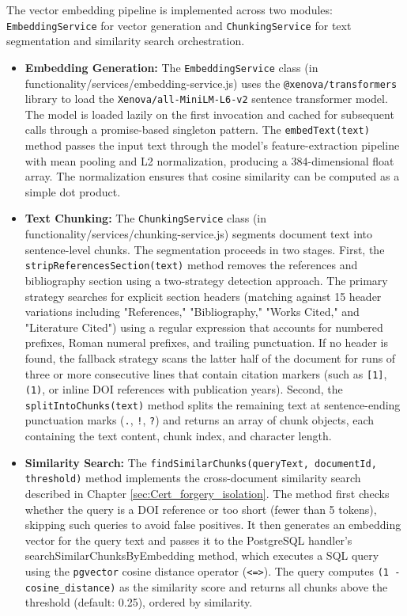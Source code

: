 The vector embedding pipeline is implemented across two modules: \texttt{EmbeddingService} for vector generation and \texttt{ChunkingService} for text segmentation and similarity search orchestration.
\begin{itemize}
    
\item \textbf{Embedding Generation:} The \texttt{EmbeddingService} class (in {functionality/services/embedding-service.js}) uses the \texttt{@xenova/transformers} library to load the \texttt{Xenova/all-MiniLM-L6-v2} sentence transformer model. The model is loaded lazily on the first invocation and cached for subsequent calls through a promise-based singleton pattern. The \texttt{embedText(text)} method passes the input text through the model's feature-extraction pipeline with mean pooling and L2 normalization, producing a 384-dimensional float array. The normalization ensures that cosine similarity can be computed as a simple dot product.

\item \textbf{Text Chunking:} The \texttt{ChunkingService} class (in {functionality/services/chunking-service.js}) segments document text into sentence-level chunks. The segmentation proceeds in two stages. First, the \texttt{stripReferencesSection(text)} method removes the references and bibliography section using a two-strategy detection approach. The primary strategy searches for explicit section headers (matching against 15 header variations including "References," "Bibliography," "Works Cited," and "Literature Cited") using a regular expression that accounts for numbered prefixes, Roman numeral prefixes, and trailing punctuation. If no header is found, the fallback strategy scans the latter half of the document for runs of three or more consecutive lines that contain citation markers (such as \texttt{[1]}, \texttt{(1)}, or inline DOI references with publication years). Second, the \texttt{splitIntoChunks(text)} method splits the remaining text at sentence-ending punctuation marks (\texttt{.}, \texttt{!}, \texttt{?}) and returns an array of chunk objects, each containing the text content, chunk index, and character length.

\item \textbf{Similarity Search:} The \texttt{findSimilarChunks(queryText, documentId, threshold)} method implements the cross-document similarity search described in Chapter \ref{sec:Cert_forgery_isolation}. The method first checks whether the query is a DOI reference or too short (fewer than 5 tokens), skipping such queries to avoid false positives. It then generates an embedding vector for the query text and passes it to the PostgreSQL handler's {searchSimilarChunksByEmbedding} method, which executes a SQL query using the \texttt{pgvector} cosine distance operator (\texttt{<=>}). The query computes \texttt{(1 - cosine\_distance)} as the similarity score and returns all chunks above the threshold (default: 0.25), ordered by similarity.


\end{itemize}
